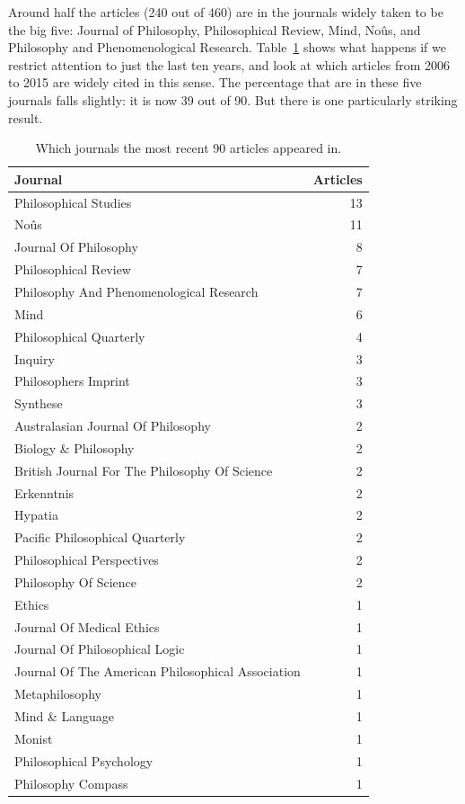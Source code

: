 \documentclass[
  10pt,
  letterpaper,
  DIV=11,
  numbers=noendperiod,
  twoside]{scrartcl}
\begin{document}
Around half the articles (240 out of 460) are in the journals widely
taken to be the big five: Journal of Philosophy, Philosophical Review,
Mind, Noûs, and Philosophy and Phenomenological Research.
Table~\ref{tbl-recent-journals-in-main-bib} shows what happens if we
restrict attention to just the last ten years, and look at which
articles from 2006 to 2015 are widely cited in this sense. The
percentage that are in these five journals falls slightly: it is now 39
out of 90. But there is one particularly striking result.

\begin{longtable}[]{@{}lr@{}}

\caption{\label{tbl-recent-journals-in-main-bib}Which journals the most
recent 90 articles appeared in.}

\tabularnewline

\toprule\noalign{}
Journal & Articles \\
\midrule\noalign{}
\endhead
\bottomrule\noalign{}
\endlastfoot
Philosophical Studies & 13 \\
Noûs & 11 \\
Journal Of Philosophy & 8 \\
Philosophical Review & 7 \\
Philosophy And Phenomenological Research & 7 \\
Mind & 6 \\
Philosophical Quarterly & 4 \\
Inquiry & 3 \\
Philosophers Imprint & 3 \\
Synthese & 3 \\
Australasian Journal Of Philosophy & 2 \\
Biology \& Philosophy & 2 \\
British Journal For The Philosophy Of Science & 2 \\
Erkenntnis & 2 \\
Hypatia & 2 \\
Pacific Philosophical Quarterly & 2 \\
Philosophical Perspectives & 2 \\
Philosophy Of Science & 2 \\
Ethics & 1 \\
Journal Of Medical Ethics & 1 \\
Journal Of Philosophical Logic & 1 \\
Journal Of The American Philosophical Association & 1 \\
Metaphilosophy & 1 \\
Mind \& Language & 1 \\
Monist & 1 \\
Philosophical Psychology & 1 \\
Philosophy Compass & 1 \\

\end{longtable}
\end{document}
